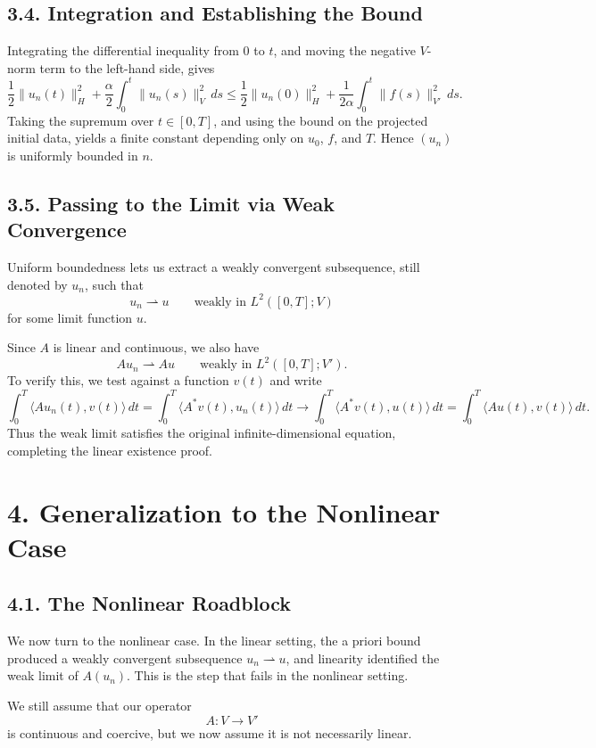 \documentclass[11pt]{article}
\theoremstyle{definition}
\theoremstyle{remark}
\begin{document}
\subsection*{3.4. Integration and Establishing the Bound}
Integrating the differential inequality from \(0\) to \(t\), and moving the negative \(V\)-norm term to the left-hand side, gives
\[
\frac12\|u_n(t)\|_H^2
+
\frac{\alpha}{2}\int_0^t \|u_n(s)\|_V^2\,ds
\le
\frac12\|u_n(0)\|_H^2+\frac{1}{2\alpha}\int_0^t \|f(s)\|_{V'}^2\,ds.
\]
Taking the supremum over \(t\in[0,T]\), and using the bound on the projected initial data, yields a finite constant depending only on \(u_0\), \(f\), and \(T\). Hence \((u_n)\) is uniformly bounded in \(n\).

\subsection*{3.5. Passing to the Limit via Weak Convergence}
Uniform boundedness lets us extract a weakly convergent subsequence, still denoted by \(u_n\), such that
\[
u_n\rightharpoonup u
\qquad
\text{weakly in } L^2([0,T];V)
\]
for some limit function \(u\).

Since \(A\) is linear and continuous, we also have
\[
Au_n\rightharpoonup Au
\qquad
\text{weakly in } L^2([0,T];V').
\]
To verify this, we test against a function \(v(t)\) and write
\[
\int_0^T \langle Au_n(t),v(t)\rangle\,dt
=
\int_0^T \langle A^*v(t),u_n(t)\rangle\,dt
\to
\int_0^T \langle A^*v(t),u(t)\rangle\,dt
=
\int_0^T \langle Au(t),v(t)\rangle\,dt.
\]
Thus the weak limit satisfies the original infinite-dimensional equation, completing the linear existence proof.

\section*{4. Generalization to the Nonlinear Case}

\subsection*{4.1. The Nonlinear Roadblock}
We now turn to the nonlinear case. In the linear setting, the a priori bound produced a weakly convergent subsequence \(u_n\rightharpoonup u\), and linearity identified the weak limit of \(A(u_n)\). This is the step that fails in the nonlinear setting.

We still assume that our operator
\[
A:V\to V'
\]
is continuous and coercive, but we now assume it is not necessarily linear.
\end{document}
